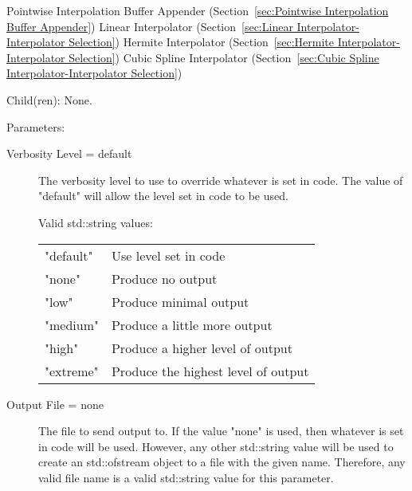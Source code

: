 \begin{list}{}
      \newline 
    Pointwise Interpolation Buffer Appender (Section~\ref{sec:Pointwise Interpolation Buffer Appender})
      \newline 
    Linear Interpolator (Section~\ref{sec:Linear Interpolator-Interpolator Selection})
      \newline 
    Hermite Interpolator (Section~\ref{sec:Hermite Interpolator-Interpolator Selection})
      \newline 
    Cubic Spline Interpolator (Section~\ref{sec:Cubic Spline Interpolator-Interpolator Selection})
  \item[Child(ren):]
    None. 
  \item[Parameters:]
    \begin{description}
      \item[Verbosity Level = default] 
The verbosity level to use to override whatever is set in code.
The value of "default" will allow the level set in code to be used.

  Valid std::string values:

      \begin{tabular}{lp{}}
      "default" & Use level set in code \\ 
      "none" & Produce no output \\ 
      "low" & Produce minimal output \\ 
      "medium" & Produce a little more output \\ 
      "high" & Produce a higher level of output \\ 
      "extreme" & Produce the highest level of output \\ 
      \end{tabular}
      \item[Output File = none] 
The file to send output to.  If the value "none" is used, then
whatever is set in code will be used.  However, any other std::string value
will be used to create an std::ofstream object to a file with the given name.
Therefore, any valid file name is a valid std::string value for this parameter.
\end{description}

\end{list}

